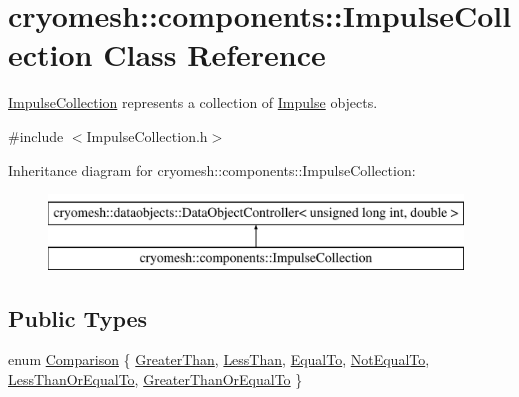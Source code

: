 \hypertarget{classcryomesh_1_1components_1_1ImpulseCollection}{\section{cryomesh\-:\-:components\-:\-:\-Impulse\-Collection \-Class \-Reference}
\label{classcryomesh_1_1components_1_1ImpulseCollection}
}


\hyperlink{classcryomesh_1_1components_1_1ImpulseCollection}{\-Impulse\-Collection} represents a collection of \hyperlink{classcryomesh_1_1components_1_1Impulse}{\-Impulse} objects.  




{\ttfamily \#include $<$\-Impulse\-Collection.\-h$>$}

\-Inheritance diagram for cryomesh\-:\-:components\-:\-:\-Impulse\-Collection\-:\begin{figure}[H]
\begin{center}
\leavevmode
\includegraphics[height=2.000000cm]{classcryomesh_1_1components_1_1ImpulseCollection}
\end{center}
\end{figure}
\subsection*{\-Public \-Types}
\begin{DoxyCompactItemize}
\item 
enum \hyperlink{classcryomesh_1_1components_1_1ImpulseCollection_a3682719f1c0bd471e8c5a19b39cc285d}{\-Comparison} \{ \*
\hyperlink{classcryomesh_1_1components_1_1ImpulseCollection_a3682719f1c0bd471e8c5a19b39cc285da5288e1792a76693414517164a2289ec8}{\-Greater\-Than}, 
\hyperlink{classcryomesh_1_1components_1_1ImpulseCollection_a3682719f1c0bd471e8c5a19b39cc285da049307d079370521e85998e7141ec3af}{\-Less\-Than}, 
\hyperlink{classcryomesh_1_1components_1_1ImpulseCollection_a3682719f1c0bd471e8c5a19b39cc285da591330a7a512ed11c4429536a5d1e6d5}{\-Equal\-To}, 
\hyperlink{classcryomesh_1_1components_1_1ImpulseCollection_a3682719f1c0bd471e8c5a19b39cc285da1402ae2e51bdcd9c25fae0dbb70e0b7a}{\-Not\-Equal\-To}, 
\*
\hyperlink{classcryomesh_1_1components_1_1ImpulseCollection_a3682719f1c0bd471e8c5a19b39cc285dabb82adff3882cdd74faaef695b6bc82d}{\-Less\-Than\-Or\-Equal\-To}, 
\hyperlink{classcryomesh_1_1components_1_1ImpulseCollection_a3682719f1c0bd471e8c5a19b39cc285da5c716b8625dde68ad195d063f37be1d1}{\-Greater\-Than\-Or\-Equal\-To}
 \}
\end{DoxyCompactItemize}

